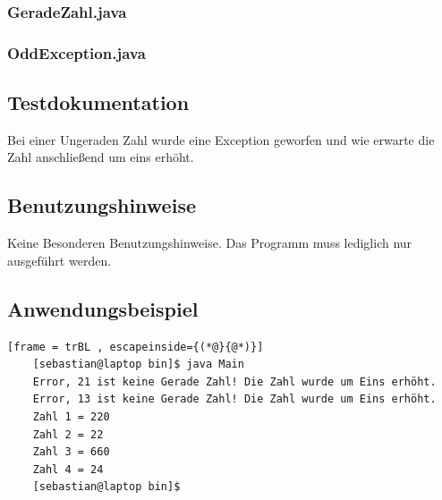 \subsubsection{GeradeZahl.java}

\subsubsection{OddException.java}


\subsection{Testdokumentation}
Bei einer Ungeraden Zahl wurde eine Exception geworfen und wie erwarte die Zahl
anschließend um eins erhöht.

\subsection{Benutzungshinweise}
Keine Besonderen Benutzungshinweise.
Das Programm muss lediglich nur ausgeführt werden.

\subsection{Anwendungsbeispiel}
\begin{lstlisting}[frame = trBL , escapeinside={(*@}{@*)}]
	[sebastian@laptop bin]$ java Main 	
	Error, 21 ist keine Gerade Zahl! Die Zahl wurde um Eins erhöht.
	Error, 13 ist keine Gerade Zahl! Die Zahl wurde um Eins erhöht.
	Zahl 1 = 220
	Zahl 2 = 22
	Zahl 3 = 660
	Zahl 4 = 24
	[sebastian@laptop bin]$ 
\end{lstlisting}